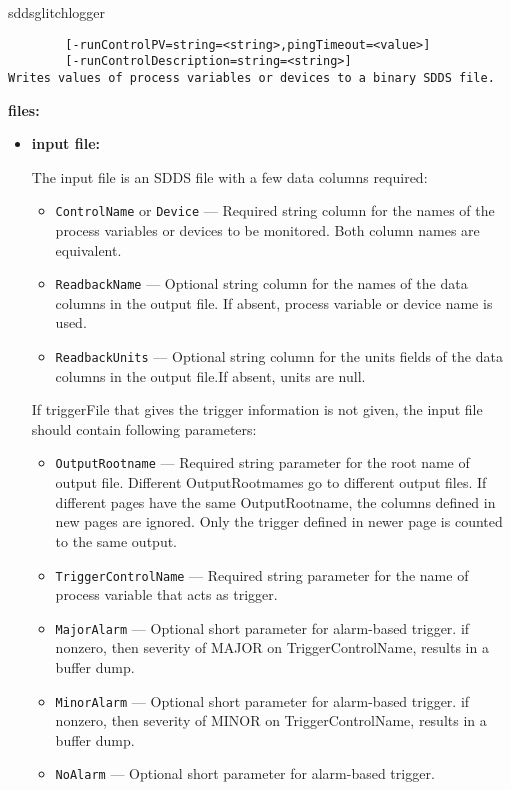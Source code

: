 \begin{sddsprog}{sddsglitchlogger}
\begin{verbatim}
        [-runControlPV=string=<string>,pingTimeout=<value>]
        [-runControlDescription=string=<string>]
Writes values of process variables or devices to a binary SDDS file.
\end{verbatim}
\item {\bf files:}
\begin{itemize}
\item {\bf input file:}\par
The input file is an SDDS file with a few data columns required:
\begin{itemize}
        \item {\tt ControlName} or {\tt Device} --- Required string column for the names of the process variables
                or devices to be monitored. Both column names are equivalent.
        \item {\tt ReadbackName} --- Optional string column for the names of the data columns in the 
                output file. If absent, process variable or device name is used.
        \item {\tt ReadbackUnits} --- Optional string column for the units fields of the data columns in the 
                output file.If absent, units are null.
\end{itemize}
If triggerFile that gives the trigger information is not given, the input file should contain following
parameters:
\begin{itemize}
        \item {\tt OutputRootname} --- Required string parameter for the root name of output file.
                Different OutputRootmames go to different output files. If different pages have the same 
                OutputRootname, the columns defined in new pages are ignored. Only the trigger defined in
                newer page is counted to the same output.
        \item {\tt TriggerControlName} --- Required string parameter for the name of process variable that
                acts as trigger.
        \item {\tt MajorAlarm}  --- Optional short parameter for alarm-based trigger.
                if nonzero, then severity of MAJOR on TriggerControlName, results in a buffer dump.
        \item {\tt MinorAlarm}  --- Optional short parameter for alarm-based trigger.
                if nonzero, then severity of MINOR on TriggerControlName, results in a buffer dump.
        \item {\tt NoAlarm}  --- Optional short parameter for alarm-based trigger.

\end{itemize}
\end{itemize}
\end{sddsprog}
